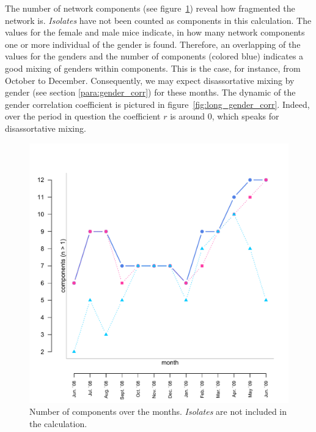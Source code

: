 The number of network components (see figure~\ref{fig:long_comps}) reveal how fragmented the network is. \textit{Isolates} have not been counted as components in this calculation. The values for the female and male mice indicate, in how many network components one or more individual of the gender is found. Therefore, an overlapping of the values for the genders and the number of components (colored blue) indicates a good mixing of genders within components. This is the case, for instance, from October to December. Consequently, we may expect disassortative mixing by gender (see section \ref{para:gender_corr}) for these months. The dynamic of the gender correlation coefficient is pictured in figure~\ref{fig:long_gender_corr}. Indeed, over the period in question the coefficient $r$ is around 0, which speaks for disassortative mixing.

\begin{figure}[htpb]
\begin{center}
  \includegraphics[width=.6\textwidth]{assets/pdf/long_comps.pdf}
  \caption[Number of components over the months]{Number of components over the months. \textit{Isolates} are not included in the calculation.}
  \label{fig:long_comps}
\end{center}
\end{figure}


% 

